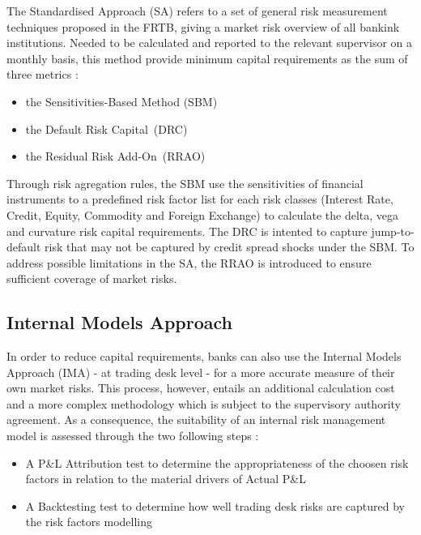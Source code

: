 \documentclass[3pt]{article}
\begin{document}
The Standardised Approach (SA) refers to a set of general risk measurement
techniques proposed in the FRTB, giving a market risk overview of all
bankink institutions. Needed to be calculated and reported to the relevant
supervisor on a monthly basis, this method provide minimum capital
requirements as the sum of three metrics :

\bigskip

\begin{itemize}
\item the Sensitivities-Based Method (SBM)

\item the Default Risk Capital\ (DRC)

\item the Residual Risk Add-On\ (RRAO)
\end{itemize}

\bigskip

Through risk agregation rules, the SBM use the sensitivities of financial
instruments to a predefined risk factor list for each risk classes (Interest
Rate, Credit, Equity, Commodity and Foreign Exchange) to calculate the
delta, vega and curvature risk capital requirements. The DRC is intented to
capture jump-to-default risk that may not be captured by credit spread
shocks under the SBM. To address possible limitations in the SA, the RRAO is
introduced to ensure sufficient coverage of market risks.

\bigskip

\subsection{Internal Models Approach}

In order to reduce capital requirements, banks can also use the Internal
Models Approach (IMA) - at trading desk level - for a more accurate measure
of their own market risks. This process, however, entails an additional
calculation cost and a more complex methodology which is subject to the
supervisory authority agreement. As a consequence, the suitability of an
internal risk management model is assessed through the two following steps :

\bigskip

\begin{itemize}
\item A P\&L Attribution test to determine the appropriateness of the
choosen risk factors in relation to the material drivers of Actual P\&L

\item A Backtesting test to determine how well trading desk risks are
captured by the risk factors modelling
\end{itemize}
\end{document}

